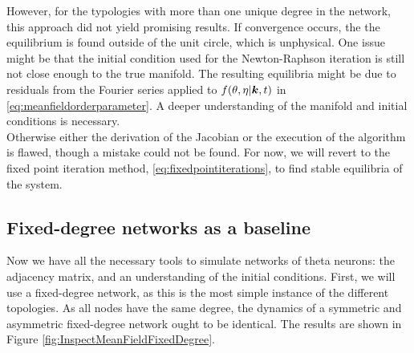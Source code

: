 However, for the typologies with more than one unique degree in the network, this approach did not yield promising results. If convergence occurs, the the equilibrium is found outside of the unit circle, which is unphysical. One issue might be that the initial condition used for the Newton-Raphson iteration is still not close enough to the true manifold. The resulting equilibria might be due to residuals from the Fourier series applied to $f(\theta, \eta | {\boldsymbol{k}}, t)$ in \eqref{eq:meanfieldorderparameter}. A deeper understanding of the manifold and initial conditions is necessary. \\

Otherwise either the derivation of the Jacobian or the execution of the algorithm is flawed, though a mistake could not be found. For now, we will revert to the fixed point iteration method, \eqref{eq:fixedpointiterations}, to find stable equilibria of the system.



\subsection{Fixed-degree networks as a baseline}
Now we have all the necessary tools to simulate networks of theta neurons: the adjacency matrix, and an understanding of the initial conditions. First, we will use a fixed-degree network, as this is the most simple instance of the different topologies. As all nodes have the same degree, the dynamics of a symmetric and asymmetric fixed-degree network ought to be identical. The results are shown in Figure \ref{fig:InspectMeanFieldFixedDegree}.

